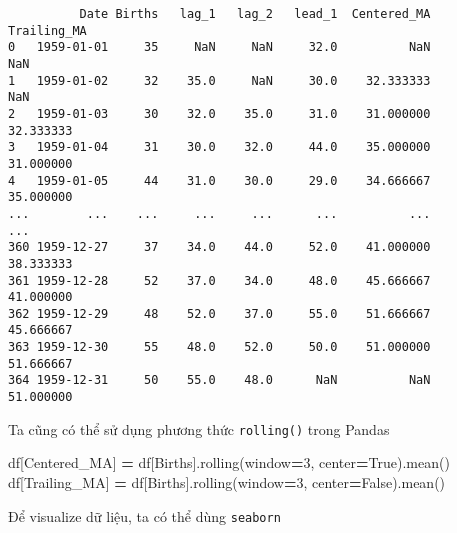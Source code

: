 \documentclass[
]{book}
\newenvironment{Shaded}{\begin{snugshade}}{\end{snugshade}}
\newcommand{\DecValTok}[1]{\textcolor[rgb]{0.00,0.00,0.81}{#1}}
\newcommand{\NormalTok}[1]{#1}
\newcommand{\OperatorTok}[1]{\textcolor[rgb]{0.81,0.36,0.00}{\textbf{#1}}}
\newcommand{\StringTok}[1]{\textcolor[rgb]{0.31,0.60,0.02}{#1}}
\newcommand{\VariableTok}[1]{\textcolor[rgb]{0.00,0.00,0.00}{#1}}
\begin{document}
\begin{verbatim}
          Date Births   lag_1   lag_2   lead_1  Centered_MA Trailing_MA
0   1959-01-01     35     NaN     NaN     32.0          NaN         NaN
1   1959-01-02     32    35.0     NaN     30.0    32.333333         NaN 
2   1959-01-03     30    32.0    35.0     31.0    31.000000   32.333333
3   1959-01-04     31    30.0    32.0     44.0    35.000000   31.000000
4   1959-01-05     44    31.0    30.0     29.0    34.666667   35.000000
...        ...    ...     ...     ...      ...          ...         ...
360 1959-12-27     37    34.0    44.0     52.0    41.000000   38.333333
361 1959-12-28     52    37.0    34.0     48.0    45.666667   41.000000
362 1959-12-29     48    52.0    37.0     55.0    51.666667   45.666667
363 1959-12-30     55    48.0    52.0     50.0    51.000000   51.666667
364 1959-12-31     50    55.0    48.0      NaN          NaN   51.000000
\end{verbatim}

Ta cũng có thể sử dụng phương thức \texttt{rolling()} trong Pandas

\begin{Shaded}
\begin{Highlighting}[]
\NormalTok{df[}\StringTok{\textquotesingle{}Centered\_MA\textquotesingle{}}\NormalTok{] }\OperatorTok{=}\NormalTok{ df[}\StringTok{\textquotesingle{}Births\textquotesingle{}}\NormalTok{].rolling(window}\OperatorTok{=}\DecValTok{3}\NormalTok{, center}\OperatorTok{=}\VariableTok{True}\NormalTok{).mean()}
\NormalTok{df[}\StringTok{\textquotesingle{}Trailing\_MA\textquotesingle{}}\NormalTok{] }\OperatorTok{=}\NormalTok{ df[}\StringTok{\textquotesingle{}Births\textquotesingle{}}\NormalTok{].rolling(window}\OperatorTok{=}\DecValTok{3}\NormalTok{, center}\OperatorTok{=}\VariableTok{False}\NormalTok{).mean()}
\end{Highlighting}
\end{Shaded}

Để visualize dữ liệu, ta có thể dùng \texttt{seaborn}
\end{document}
